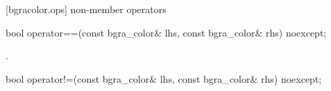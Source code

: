  [bgracolor.ops] { non-member operators}

\begin{itemdecl}
bool operator==(const bgra_color& lhs, const bgra_color& rhs) noexcept;
\end{itemdecl}
\begin{itemdescr}
\pnum
\returns
{}.
\end{itemdescr}

\begin{itemdecl}
bool operator!=(const bgra_color& lhs, const bgra_color& rhs) noexcept;
\end{itemdecl}
\begin{itemdescr}
\pnum
\returns
{}
\end{itemdescr}
